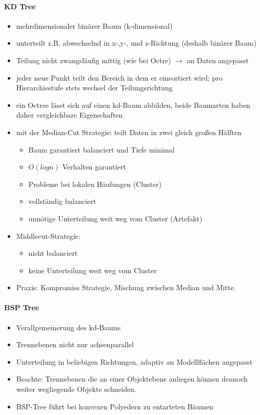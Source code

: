 \documentclass[10pt,landscape]{article}
\begin{document}
\begin{multicols}{3}
  \paragraph{KD Tree}
  \begin{itemize}
    \item mehrdimensionaler binärer Baum (k-dimensional)
    \item unterteilt z.B. abwechselnd in x-,y-, und z-Richtung (deshalb binärer Baum)
    \item Teilung nicht zwangsläufig mittig (wie bei Octre) $\rightarrow$ an Daten angepasst
    \item jeder neue Punkt teilt den Bereich in dem er einsortiert wird; pro Hierarchiestufe stets wechsel der Teilungsrichtung
    \item ein Octree lässt sich auf einen kd-Baum abbilden, beide Baumarten haben daher vergleichbare Eigenschaften
    \item mit der Median-Cut Strategie: teilt Daten in zwei gleich großen Hälften
          \begin{itemize}
            \item Baum garantiert balanciert und Tiefe minimal
            \item $O(log n)$ Verhalten garantiert
            \item Probleme bei lokalen Häufungen (Cluster)
            \item vollständig balanciert
            \item unnötige Unterteilung weit weg vom Cluster (Artefakt)
          \end{itemize}
    \item Middlecut-Strategie:
          \begin{itemize}
            \item nicht balanciert
            \item keine Unterteilung weit weg vom Cluster
          \end{itemize}
    \item Praxis: Kompromiss Strategie, Mischung zwischen Median und Mitte.
  \end{itemize}
  
  \paragraph{BSP Tree}
  \begin{itemize}
    \item Verallgemeinerung des kd-Baums
    \item Trennebenen nicht nur achsenparallel
    \item Unterteilung in beliebigen Richtungen, adaptiv an Modellflächen angepasst
    \item Beachte: Trennebenen die an einer Objektebene anliegen können dennoch weiter wegliegende Objekte schneiden.
    \item BSP-Tree führt bei konvexen Polyedern zu entarteten Bäumen
  \end{itemize}
  

\end{multicols}
\end{document}
